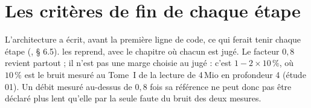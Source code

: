 \section{Les critères de fin de chaque étape}\label{t2ann:sec:etapes}

L'architecture a écrit, avant la première ligne de code, ce qui ferait tenir chaque étape (, § 6.5).  les reprend, avec le chapitre où chacun est jugé. Le facteur $0{,}8$ revient partout ; il n'est pas une marge choisie au jugé : c'est $1 - 2 \times 10\,\%$, où $10\,\%$ est le bruit mesuré au Tome~I de la lecture de 4\,Mio en profondeur 4 (étude 01). Un débit mesuré au-dessus de $0{,}8$ fois sa référence ne peut donc pas être déclaré plus lent qu'elle par la seule faute du bruit des deux mesures.

